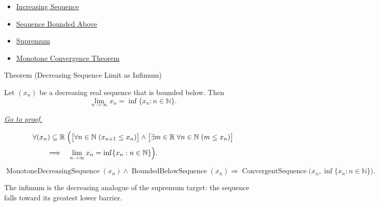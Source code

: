 \begin{dependencies}
\begin{itemize}
  \item \hyperref[def:increasing-sequence]{Increasing Sequence}
  \item \hyperref[def:sequence-bounded-above]{Sequence Bounded Above}
  \item \hyperref[def:supremum]{Supremum}
  \item \hyperref[thm:monotone-convergence-theorem]{Monotone Convergence Theorem}
\end{itemize}
\end{dependencies}


\begin{theorembox}{Theorem (Decreasing Sequence Limit as Infimum)}
\begin{theorem}
\label{thm:decreasing-sequence-limit-as-infimum}
Let $(x_n)$ be a decreasing real sequence that is bounded below. Then
\[
  \lim_{n\to\infty}x_n=\inf\{x_n:n\in\mathbb{N}\}.
\]

\smallskip
\noindent
\hyperref[prf:decreasing-sequence-limit-as-infimum]{\textit{Go to proof.}}
\end{theorem}
\end{theorembox}

\begin{remark*}
\[
\begin{aligned}
&\forall (x_n)\subseteq\mathbb{R}\;
\Bigl(
  \bigl[\forall n\in\mathbb{N}\;(x_{n+1}\le x_n)\bigr]
  \land
  \bigl[\exists m\in\mathbb{R}\;\forall n\in\mathbb{N}\;(m\le x_n)\bigr]\\
&\qquad\Longrightarrow\quad
  \lim_{n\to\infty}x_n=\inf\{x_n:n\in\mathbb{N}\}
\Bigr).
\end{aligned}
\]
\end{remark*}

\begin{remark*}
\[
\operatorname{MonotoneDecreasingSequence}(x_n)
\land
\operatorname{BoundedBelowSequence}(x_n)
\Longrightarrow
\operatorname{ConvergentSequence}\bigl(x_n,\inf\{x_n:n\in\mathbb{N}\}\bigr).
\]
\end{remark*}

\begin{remark*}[Interpretation]
The infimum is the decreasing analogue of the supremum target: the sequence
falls toward its greatest lower barrier.
\end{remark*}


